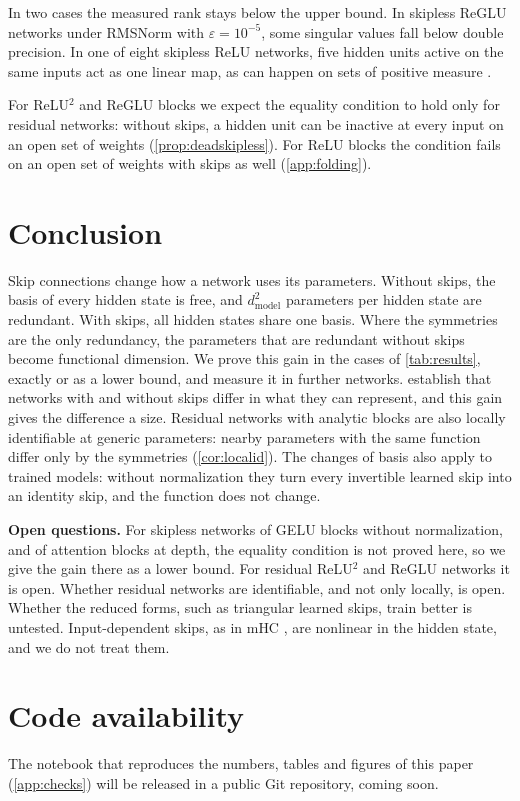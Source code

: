 \documentclass[10pt]{article}
\theoremstyle{definition}
\theoremstyle{remark}
\newcommand{\dm}{d_{\mathrm{model}}}
\newcommand{\para}[1]{\smallskip\noindent\textbf{#1}\hspace{0.5em}}
\begin{document}
In two cases the measured rank stays below the upper bound. In skipless ReGLU networks under RMSNorm with $\varepsilon = 10^{-5}$, some singular values fall below double precision. In one of eight skipless ReLU networks, five hidden units active on the same inputs act as one linear map, as can happen on sets of positive measure \citep{grigsby2023hidden}.

For ReLU$^2$ and ReGLU blocks we expect the equality condition to hold only for residual networks: without skips, a hidden unit can be inactive at every input on an open set of weights (\cref{prop:deadskipless}). For ReLU blocks the condition fails on an open set of weights with skips as well (\cref{app:folding}).

\section{Conclusion}\label{sec:outlook}\label{sec:conclusion}

Skip connections change how a network uses its parameters. Without skips, the basis of every hidden state is free, and $\dm^2$ parameters per hidden state are redundant. With skips, all hidden states share one basis. Where the symmetries are the only redundancy, the parameters that are redundant without skips become functional dimension. We prove this gain in the cases of \cref{tab:results}, exactly or as a lower bound, and measure it in further networks. \citet{mijoski2026worth} establish that networks with and without skips differ in what they can represent, and this gain gives the difference a size. Residual networks with analytic blocks are also locally identifiable at generic parameters: nearby parameters with the same function differ only by the symmetries (\cref{cor:localid}). The changes of basis also apply to trained models: without normalization they turn every invertible learned skip into an identity skip, and the function does not change.

\para{Open questions.} For skipless networks of GELU blocks without normalization, and of attention blocks at depth, the equality condition is not proved here, so we give the gain there as a lower bound. For residual ReLU$^2$ and ReGLU networks it is open. Whether residual networks are identifiable, and not only locally, is open. Whether the reduced forms, such as triangular learned skips, train better is untested. Input-dependent skips, as in mHC \citep{xie2025mhc}, are nonlinear in the hidden state, and we do not treat them.

\section*{Code availability}
The notebook that reproduces the numbers, tables and figures of this paper (\cref{app:checks}) will be released in a public Git repository, coming soon.
\end{document}
